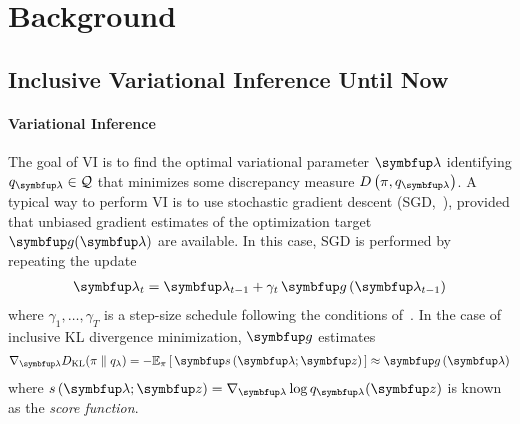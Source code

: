 
\section{Background}
\vspace{-0.05in}
\subsection{Inclusive Variational Inference Until Now}\label{section:ivi_previous}
\vspace{-0.05in}
\paragraph{Variational Inference}
The goal of VI is to find the optimal variational parameter \(\vlambda\) identifying \(q_{\vlambda} \in \mathcal{Q}\) that minimizes some discrepancy measure \(D\left(\pi, q_{\vlambda}\right)\).
A typical way to perform VI is to use stochastic gradient descent (SGD,~\citealt{robbins_stochastic_1951}), provided that unbiased gradient estimates of the optimization target \(\vg(\vlambda)\) are available.
In this case, SGD is performed by repeating the update
\vspace{-0.05in}
\begin{align}
  \vlambda_{t} = \vlambda_{t-1} + \gamma_{t} \, \vg\left(\vlambda_{t-1}\right)
\end{align}
where \(\gamma_1, \ldots, \gamma_T\) is a step-size schedule following the conditions of~\citet{robbins_stochastic_1951, bottou_online_1999}.
In the case of inclusive KL divergence minimization, \(\vg\) estimates
%
\vspace{-0.05in}
{
\begin{align}
  \nabla_{\vlambda} \DKL{\pi}{q_{\lambda}}
  = -\Esub{\pi}{ \vs\,(\vlambda; \vz) } 
  \approx \vg\left(\vlambda\right)
\end{align}
}%
%
where \(s\,(\vlambda;\vz) = \nabla_{\vlambda} \log q_{\vlambda}(\vz)\) is known as the \textit{score function}.

\vspace{-0.05in}

